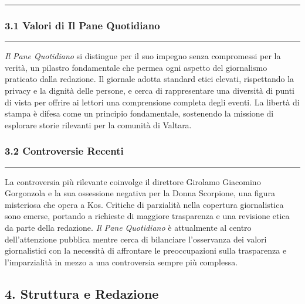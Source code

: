 \begin{center}\rule{0.5\linewidth}{0.5pt}\end{center}

\subsubsection{\texorpdfstring{3.1 \textbf{Valori di Il Pane
Quotidiano}}{3.1 Valori di Il Pane Quotidiano}}\label{valori-di-il-pane-quotidiano}

\begin{center}\rule{0.5\linewidth}{0.5pt}\end{center}

\emph{Il Pane Quotidiano} si distingue per il suo impegno senza
compromessi per la verità, un pilastro fondamentale che permea ogni
aspetto del giornalismo praticato dalla redazione. Il giornale adotta
standard etici elevati, rispettando la privacy e la dignità delle
persone, e cerca di rappresentare una diversità di punti di vista per
offrire ai lettori una comprensione completa degli eventi. La libertà di
stampa è difesa come un principio fondamentale, sostenendo la missione
di esplorare storie rilevanti per la comunità di Valtara.

\subsubsection{\texorpdfstring{3.2 \textbf{Controversie
Recenti}}{3.2 Controversie Recenti}}\label{controversie-recenti}

\begin{center}\rule{0.5\linewidth}{0.5pt}\end{center}

La controversia più rilevante coinvolge il direttore Girolamo Giacomino
Gorgonzola e la sua ossessione negativa per la Donna Scorpione, una
figura misteriosa che opera a Kos. Critiche di parzialità nella
copertura giornalistica sono emerse, portando a richieste di maggiore
trasparenza e una revisione etica da parte della redazione. \emph{Il
Pane Quotidiano} è attualmente al centro dell'attenzione pubblica mentre
cerca di bilanciare l'osservanza dei valori giornalistici con la
necessità di affrontare le preoccupazioni sulla trasparenza e
l'imparzialità in mezzo a una controversia sempre più complessa.

\subsection{4. Struttura e Redazione}\label{struttura-e-redazione}


